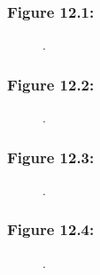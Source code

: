 \documentclass[t]{beamer}\usepackage[]{graphicx}\usepackage[]{color}
\begin{document}
\begin{frame}[label=Figure_12_1]
\frametitle{Figure 12.1: }
\begin{figure}[t]
\begin{minipage}[b]{\textwidth}
\centering

\caption{.}
\end{minipage}
\end{figure}
\end{frame}


\begin{frame}[label=Figure_12_2]
\frametitle{Figure 12.2: }
\begin{figure}[t]
\begin{minipage}[b]{\textwidth}
\centering

\caption{.}
\end{minipage}
\end{figure}
\end{frame}


\begin{frame}[label=Figure_12_3]
\frametitle{Figure 12.3: }
\begin{figure}[t]
\begin{minipage}[b]{\textwidth}
\centering

\caption{.}
\end{minipage}
\end{figure}
\end{frame}


\begin{frame}[label=Figure_12_4]
\frametitle{Figure 12.4: }
\begin{figure}[t]
\begin{minipage}[b]{\textwidth}
\centering

\caption{.}
\end{minipage}
\end{figure}
\end{frame}
\end{document}
